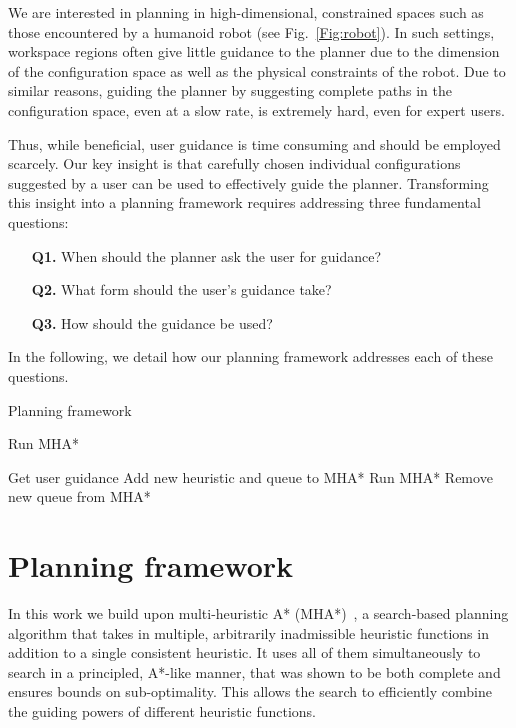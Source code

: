 \documentclass[conference]{IEEEtran}
\begin{document}
We are interested in planning in high-dimensional, constrained spaces such as those encountered by a humanoid robot (see Fig.~\ref{Fig:robot}).
In such settings, workspace regions often give little guidance to the planner due to the dimension of the configuration space as well as the physical constraints of the robot.
Due to similar reasons, guiding the planner by suggesting complete paths in the configuration space, even at a slow rate, is extremely hard, even for expert users.

Thus,  while beneficial, user guidance is  time consuming and should be employed scarcely.
Our key insight is that carefully chosen individual configurations suggested by a user can be used to effectively guide the planner.
Transforming this insight into a planning framework requires addressing three fundamental questions:

\begin{itemize}
	\item[\textbf{Q1.}] When should the planner ask the user for guidance?
	\item[\textbf{Q2.}] What form should the user's guidance take?
	\item[\textbf{Q3.}] How should the guidance be used?
\end{itemize}
 
In the following, we detail how our planning framework addresses each of these questions.

\begin{algorithm}[tb]
\caption{Planning framework}
\label{alg:main}	
\begin{algorithmic}[1]
{} 
		\State Run MHA*
	\EndWhile
	
	\State Get user guidance
	\State Add new heuristic and queue to MHA*
		\State Run MHA*
	\EndWhile
	\State Remove new queue from MHA*

\EndWhile
\end{algorithmic}
\end{algorithm}

\section{Planning framework}
\label{sec:planning}
In this work we build upon multi-heuristic A* (MHA*)~\cite{ASNHL16}, a search-based planning algorithm that takes in multiple, arbitrarily inadmissible heuristic functions in addition to a single consistent heuristic.
It uses all of them simultaneously to search in a principled, A*-like manner, that was shown to be both complete and ensures bounds on sub-optimality. 
This allows the search to efficiently combine the guiding powers of different heuristic functions. 
\end{document}
